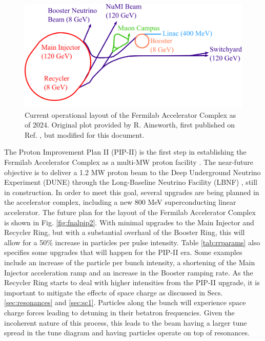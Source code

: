 \begin{figure}[H]
   \centering
   \includegraphics[width=\columnwidth]{chapter3/complex_noTev.png}
   \caption{Current operational layout of the Fermilab Accelerator Complex as of 2024. Original plot provided by R. Ainsworth, first published on Ref. \cite{rr1}, but modified for this document.}
   \label{fig:fnal}
\end{figure}

The Proton Improvement Plan II (PIP-II) is the first step in establishing the Fermilab Accelerator Complex as a multi-MW proton facility \cite{pipII1}. The near-future objective is to deliver a 1.2 MW proton beam to the Deep Underground Neutrino Experiment (DUNE) through the Long-Baseline Neutrino Facility (LBNF) \cite{dune}, still in construction. In order to meet this goal, several upgrades are being planned in the accelerator complex, including a new 800 MeV superconducting linear accelerator. The future plan for the layout of the Fermilab Accelerator Complex is shown in Fig. \ref{fig:fnalpip2}. With minimal upgrades to the Main Injector and Recycler Ring, but with a substantial overhaul of the Booster Ring, this will allow for a 50\% increase in particles per pulse intensity. Table \ref{tab:rrparams} also specifies some upgrades that will happen for the PIP-II era. Some examples include an increase of the particle per bunch intensity, a shortening of the Main Injector acceleration ramp and an increase in the Booster ramping rate. As the Recycler Ring starts to deal with higher intensities from the PIP-II upgrade, it is important to mitigate the effects of space charge as discussed in Secs. \ref{sec:resonances} and \ref{sec:sc1}. Particles along the bunch will experience space charge forces leading to detuning in their betatron frequencies. Given the incoherent nature of this process, this leads to the beam having a larger tune spread in the tune diagram and having particles operate on top of resonances.

